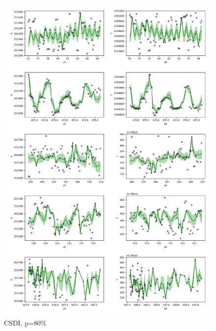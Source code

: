 \documentclass[11pt]{article}
\begin{document}
\begin{figure}[h]
  \centering
  \includegraphics[width=\textwidth]{../figure/80_5094_csdi} %
  \caption{CSDI, p=80\%}
  \label{fig: csdi_80} %
\end{figure}
\end{document}
